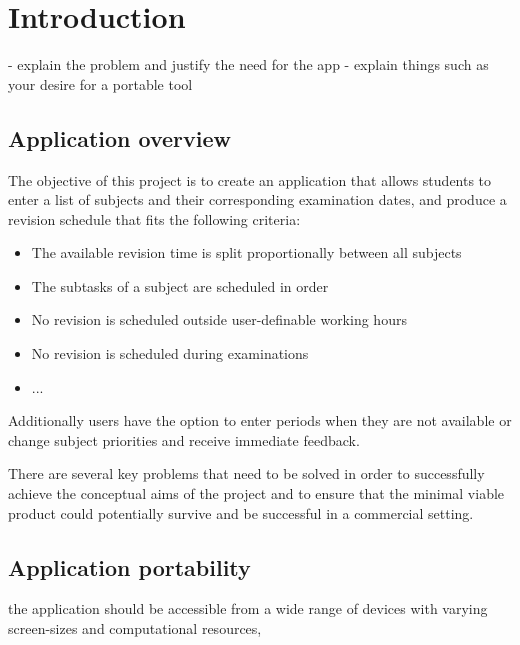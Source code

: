\documentclass[bsc,frontabs,twoside,singlespacing,parskip]{infthesis}     %
\begin{document}



\tableofcontents



\chapter{Introduction}
	- explain the problem and justify the need for the app
	- explain things such as your desire for a portable tool

	\section{Application overview}

		The objective of this project is to create an application that allows students to enter a list of subjects and their corresponding examination dates, and produce a revision schedule that fits the following criteria:

		\begin{itemize}
		  \item The available revision time is split proportionally between all subjects
		  \item The subtasks of a subject are scheduled in order
		  \item No revision is scheduled outside user-definable working hours
		  \item No revision is scheduled during examinations
		  \item ...
		\end{itemize}

		Additionally users have the option to enter periods when they are not available or change subject priorities and receive immediate feedback.

		There are several key problems that need to be solved in order to successfully achieve the conceptual aims of the project and to ensure that the minimal viable product could potentially survive and be successful in a commercial setting.

	\section{Application portability}
	the application should be accessible from a wide range of devices with varying screen-sizes and computational resources,
\end{document}
